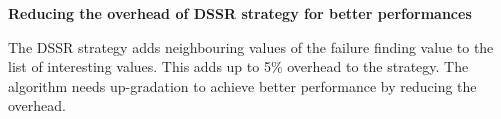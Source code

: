 \textbf{Reducing the overhead of DSSR strategy for better performances}

The DSSR strategy adds neighbouring values of the failure finding value to the list of interesting values. This adds up to 5\% overhead to the strategy. The algorithm needs up-gradation to achieve better performance by reducing the overhead.











